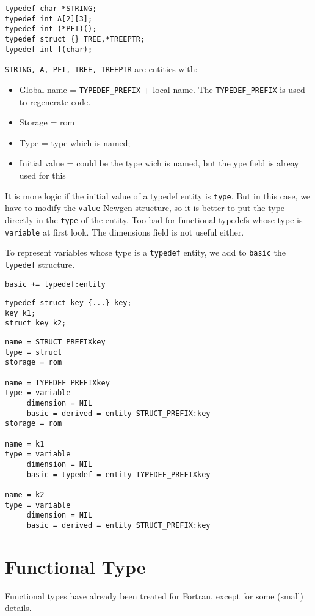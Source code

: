 \documentclass[a4paper]{report}
\begin{document}
\begin{lstlisting}
typedef char *STRING;
typedef int A[2][3];
typedef int (*PFI)();
typedef struct {} TREE,*TREEPTR;
typedef int f(char);
\end{lstlisting}
\verb/STRING, A, PFI, TREE, TREEPTR/ are entities with:
\begin{itemize}
\item Global name = \verb/TYPEDEF_PREFIX/ + local name. The \verb/TYPEDEF_PREFIX/ is
  used to regenerate code. 
\item Storage = rom 
\item Type = type which is named;
\item Initial value = could be the type wich is named, but the ype field is alreay used for this
\end{itemize}
It is more logic if the initial value of a typedef entity is
 \verb/type/. But in this case, we have to modify the \verb/value/
 Newgen structure, so it is better to put the type directly in the
 \verb/type/ of the entity. Too bad for functional typedefs whose type
 is \verb/variable/ at first look. The dimensions field is not useful
 either.

To represent variables whose type is a \verb/typedef/ entity, we add to
\verb/basic/ the \verb/typedef/ structure. 

\verb/basic += typedef:entity/ 

\begin{lstlisting}
typedef struct key {...} key;
key k1;
struct key k2; 
\end{lstlisting}  

\begin{verbatim}
name = STRUCT_PREFIXkey
type = struct  
storage = rom 

name = TYPEDEF_PREFIXkey 
type = variable 
     dimension = NIL
     basic = derived = entity STRUCT_PREFIX:key
storage = rom

name = k1
type = variable 
     dimension = NIL
     basic = typedef = entity TYPEDEF_PREFIXkey

name = k2
type = variable 
     dimension = NIL
     basic = derived = entity STRUCT_PREFIX:key
\end{verbatim}

\section{Functional Type}

Functional types have already been treated for Fortran, except for
 some (small) details.
\end{document}
